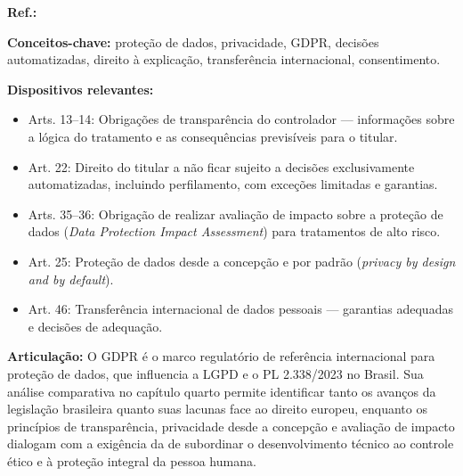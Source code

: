 \begin{fichamento}
    \textbf{Ref.:} \cite{UE2016GDPR}
    
    \textbf{Conceitos-chave:} proteção de dados, privacidade, GDPR, decisões automatizadas, direito à explicação, transferência internacional, consentimento.
    
    \textbf{Dispositivos relevantes:}
    \begin{itemize}
        \item Arts. 13–14: Obrigações de transparência do controlador — informações sobre a lógica do tratamento e as consequências previsíveis para o titular.
        \item Art. 22: Direito do titular a não ficar sujeito a decisões exclusivamente automatizadas, incluindo perfilamento, com exceções limitadas e garantias.
        \item Arts. 35–36: Obrigação de realizar avaliação de impacto sobre a proteção de dados (\textit{Data Protection Impact Assessment}) para tratamentos de alto risco.
        \item Art. 25: Proteção de dados desde a concepção e por padrão (\textit{privacy by design and by default}).
        \item Art. 46: Transferência internacional de dados pessoais — garantias adequadas e decisões de adequação.
    \end{itemize}
    
    \textbf{Articulação:} O GDPR é o marco regulatório de referência internacional para proteção de dados, que influencia a LGPD e o PL 2.338/2023 no Brasil. Sua análise comparativa no capítulo quarto permite identificar tanto os avanços da legislação brasileira quanto suas lacunas face ao direito europeu, enquanto os princípios de transparência, privacidade desde a concepção e avaliação de impacto dialogam com a exigência da \MH{} de subordinar o desenvolvimento técnico ao controle ético e à proteção integral da pessoa humana.
\end{fichamento}


